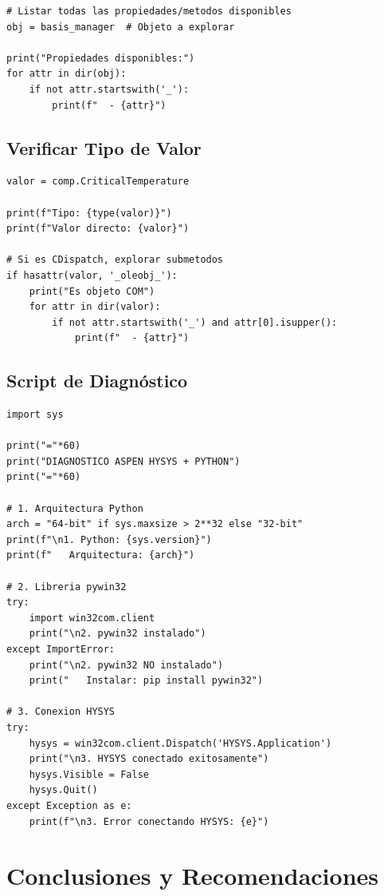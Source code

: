 \documentclass[12pt,a4paper]{article}
\begin{document}
\begin{lstlisting}
# Listar todas las propiedades/metodos disponibles
obj = basis_manager  # Objeto a explorar

print("Propiedades disponibles:")
for attr in dir(obj):
    if not attr.startswith('_'):
        print(f"  - {attr}")
\end{lstlisting}

\subsection{Verificar Tipo de Valor}

\begin{lstlisting}
valor = comp.CriticalTemperature

print(f"Tipo: {type(valor)}")
print(f"Valor directo: {valor}")

# Si es CDispatch, explorar submetodos
if hasattr(valor, '_oleobj_'):
    print("Es objeto COM")
    for attr in dir(valor):
        if not attr.startswith('_') and attr[0].isupper():
            print(f"  - {attr}")
\end{lstlisting}

\subsection{Script de Diagnóstico}

\begin{lstlisting}
import sys

print("="*60)
print("DIAGNOSTICO ASPEN HYSYS + PYTHON")
print("="*60)

# 1. Arquitectura Python
arch = "64-bit" if sys.maxsize > 2**32 else "32-bit"
print(f"\n1. Python: {sys.version}")
print(f"   Arquitectura: {arch}")

# 2. Libreria pywin32
try:
    import win32com.client
    print("\n2. pywin32 instalado")
except ImportError:
    print("\n2. pywin32 NO instalado")
    print("   Instalar: pip install pywin32")

# 3. Conexion HYSYS
try:
    hysys = win32com.client.Dispatch('HYSYS.Application')
    print("\n3. HYSYS conectado exitosamente")
    hysys.Visible = False
    hysys.Quit()
except Exception as e:
    print(f"\n3. Error conectando HYSYS: {e}")
\end{lstlisting}

\section{Conclusiones y Recomendaciones}
\end{document}

